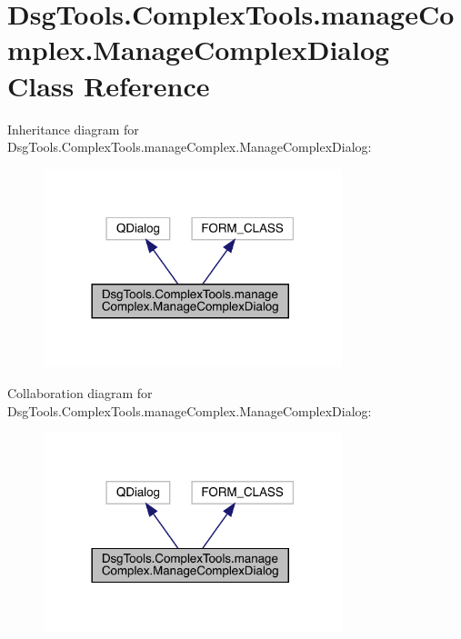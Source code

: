 \hypertarget{class_dsg_tools_1_1_complex_tools_1_1manage_complex_1_1_manage_complex_dialog}{}\section{Dsg\+Tools.\+Complex\+Tools.\+manage\+Complex.\+Manage\+Complex\+Dialog Class Reference}
\label{class_dsg_tools_1_1_complex_tools_1_1manage_complex_1_1_manage_complex_dialog}


Inheritance diagram for Dsg\+Tools.\+Complex\+Tools.\+manage\+Complex.\+Manage\+Complex\+Dialog\+:
\nopagebreak
\begin{figure}[H]
\begin{center}
\leavevmode
\includegraphics[width=246pt]{class_dsg_tools_1_1_complex_tools_1_1manage_complex_1_1_manage_complex_dialog__inherit__graph}
\end{center}
\end{figure}


Collaboration diagram for Dsg\+Tools.\+Complex\+Tools.\+manage\+Complex.\+Manage\+Complex\+Dialog\+:
\nopagebreak
\begin{figure}[H]
\begin{center}
\leavevmode
\includegraphics[width=246pt]{class_dsg_tools_1_1_complex_tools_1_1manage_complex_1_1_manage_complex_dialog__coll__graph}
\end{center}
\end{figure}
